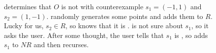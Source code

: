 \begin{figure*}[ht]
\begin{subfigure}[t]{0.58\textwidth}
    \caption{%
      \Helper{} determines that $O$ is not  with
      counterexample $s_1 = (-1, 1)$ and $s_2 = (1, -1)$. \Helper{} randomly
      generates some \sTIreachable{} points and adds them to $R$. Lucky for
      us, $s_2 \in R$, so \Helper{} knows that it is \sTIreachable{}.
      \Helper{} is not sure about $s_1$, so it asks the user. After some
      thought, the user tells \Helper{} that $s_1$ is \sTIunreachable{}, so
      \Helper{} adds $s_1$ to $NR$ and then recurses.
    }
  \end{subfigure}


\end{figure*}
